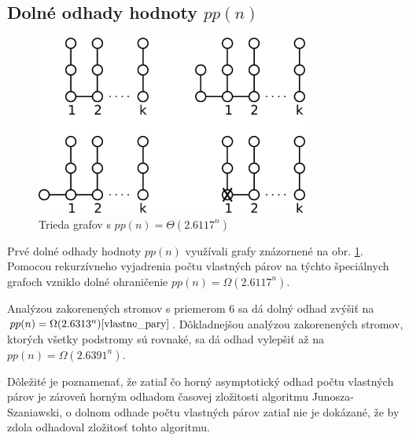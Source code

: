 \subsection{Dolné odhady hodnoty $pp(n)$}

\begin{figure}

\centerline{\includegraphics[width=0.8\textwidth]{images/pp_hreben.pdf}}

\caption[Trieda grafov s vysokým $pp(n)$]{Trieda grafov s $pp(n) = \Theta(2.6117^n)$}

\label{pp:hreben}

\end{figure}

Prvé dolné odhady hodnoty $pp(n)$ využívali grafy znázornené na obr. \ref{pp:hreben}.
Pomocou rekurzívneho vyjadrenia počtu vlastných párov na týchto špeciálnych grafoch
vzniklo dolné ohraničenie $pp(n) = \Omega(2.6117^n)$.

Analýzou zakorenených stromov s priemerom $6$ sa dá dolný odhad zvýšiť na $pp(n) = \Omega(2.6313^n)\cite{vlastne_pary}$.
Dôkladnejšou analýzou zakorenených stromov, ktorých všetky podstromy sú rovnaké, sa dá
odhad vylepšiť až na $pp(n) = \Omega(2.6391^n)$\cite{vlastne_pary}.

Dôležité je poznamenať, že zatiaľ čo horný asymptotický odhad počtu vlastných párov je zároveň
horným odhadom časovej zložitosti algoritmu Junosza-Szaniawski, o dolnom odhade počtu vlastných
párov zatiaľ nie je dokázané, že by zdola odhadoval zložitosť tohto algoritmu.

